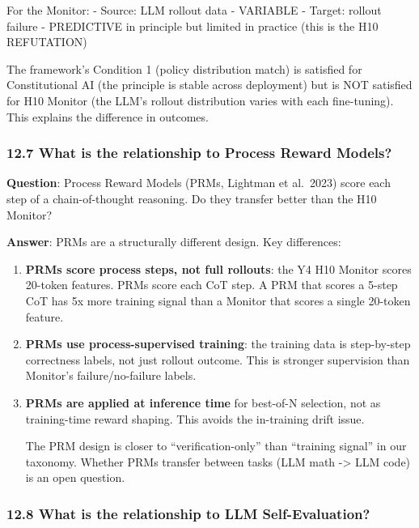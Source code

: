 \documentclass[
]{article}
\begin{document}
For the Monitor: - Source: LLM rollout data - VARIABLE - Target: rollout
failure - PREDICTIVE in principle but limited in practice (this is the
H10 REFUTATION)

The framework's Condition 1 (policy distribution match) is satisfied for
Constitutional AI (the principle is stable across deployment) but is NOT
satisfied for H10 Monitor (the LLM's rollout distribution varies with
each fine-tuning). This explains the difference in outcomes.

\subsubsection{12.7 What is the relationship to Process Reward
Models?}\label{what-is-the-relationship-to-process-reward-models}

\textbf{Question}: Process Reward Models (PRMs, Lightman et al.~2023)
score each step of a chain-of-thought reasoning. Do they transfer better
than the H10 Monitor?

\textbf{Answer}: PRMs are a structurally different design. Key
differences:

\begin{enumerate}
\def\labelenumi{\arabic{enumi}.}
\item
  \textbf{PRMs score process steps, not full rollouts}: the Y4 H10
  Monitor scores 20-token features. PRMs score each CoT step. A PRM that
  scores a 5-step CoT has 5x more training signal than a Monitor that
  scores a single 20-token feature.
\item
  \textbf{PRMs use process-supervised training}: the training data is
  step-by-step correctness labels, not just rollout outcome. This is
  stronger supervision than Monitor's failure/no-failure labels.
\item
  \textbf{PRMs are applied at inference time} for best-of-N selection,
  not as training-time reward shaping. This avoids the in-training drift
  issue.

  The PRM design is closer to ``verification-only'' than ``training
  signal'' in our taxonomy. Whether PRMs transfer between tasks (LLM
  math -\textgreater{} LLM code) is an open question.
\end{enumerate}

\subsubsection{12.8 What is the relationship to LLM
Self-Evaluation?}\label{what-is-the-relationship-to-llm-self-evaluation}
\end{document}
